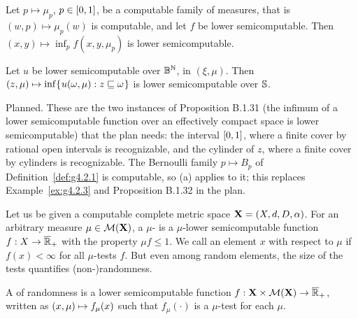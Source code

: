 \begin{ourtheorem}\label{our:lsc-inf}
 \begin{alphenum}
  \item Let \( p\mapsto\mu_{p} \), \( p\in[0,1] \), be a computable family of measures,
that is \( (w,p)\mapsto\mu_{p}(w) \) is computable, and let \( f \) be lower semicomputable.
Then \( (x,y)\mapsto\inf_{p}f(x,y,\mu_{p}) \) is lower semicomputable.
  \item Let \( u \) be lower semicomputable over \( \mathbb{B}^{\mathbb{N}} \), in \( (\xi,\mu) \).
Then \( (z,\mu)\mapsto\inf\mathopen\{\mskip 1mu u(\omega,\mu) : z\sqsubseteq\omega\mskip 1mu\mathclose\} \) is lower semicomputable over
\( \mathbb{S} \).
 \end{alphenum}
\end{ourtheorem}

\begin{formalization}
Planned. These are the two instances of Proposition B.1.31 (the infimum of a lower
semicomputable function over an effectively compact space is lower semicomputable) that the plan
needs: the interval $[0,1]$, where a finite cover by rational open intervals is
recognizable, and the cylinder of $z$, where a finite cover by cylinders is recognizable. The
Bernoulli family $p\mapsto B_{p}$ of Definition~\ref{def:g4.2.1} is computable, so (a) applies to
it; this replaces Example~\ref{ex:g4.2.3} and Proposition B.1.32 in the plan.
\end{formalization}


 \begin{definition}\label{def:mu-test}
Let us be given a computable complete metric space \( \mathbf{X} = (X, d, D, \alpha) \).
For an arbitrary measure \( \mu\in\mathcal{M}(\mathbf{X}) \), a \( \mu \)-
is a \( \mu \)-lower semicomputable function \( f:X\to\overline{\mathbb{R}}_{+} \) with the property
\( \mu f \le 1 \).
We call an element \( x \)  with respect to \( \mu \)
if \( f(x)<\infty \) for all \( \mu \)-tests \( f \).
But even among random elements, the size of the tests quantifies
(non-)randomness.

A  of randomness is a lower semicomputable function
\( f:\mathbf{X}\times\mathcal{M}(\mathbf{X})\to \overline{\mathbb{R}}_{+} \), 
written as \( (x,\mu)\mapsto f_{\mu}(x) \)
such that \( f_{\mu}(\cdot) \) is a \( \mu \)-test for each \( \mu \).
 \end{definition}

